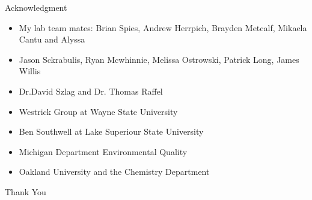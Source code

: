 \begin{frame}{Acknowledgment}

	\begin{itemize} 
		\item My lab team mates: Brian Spies, Andrew Herrpich, Brayden Metcalf, Mikaela Cantu and Alyssa
		\item Jason Sckrabulis, Ryan Mcwhinnie, Melissa Ostrowski, Patrick Long, James Willis
		\item Dr.David Szlag and Dr. Thomas Raffel
		\item Westrick Group at Wayne State University
		\item Ben Southwell at Lake Superiour State University
		\item Michigan Department Environmental Quality
		\item Oakland University and the Chemistry Department
	\end{itemize}
\end{frame}
\begin{frame}
\begin{center}
Thank You
\end{center}
\end{frame}
